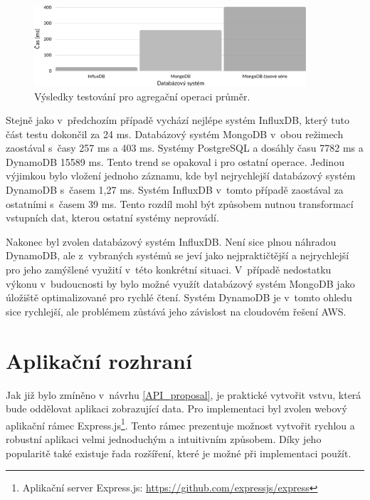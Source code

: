 \begin{figure}[H]
\label{averageAggregationTime}
\begin{center}
    \includegraphics[width=0.9\textwidth]{obrazky-figures/averageAggregationTime.pdf}
\end{center}
\caption{Výsledky testování pro agregační operaci průměr.}
\end{figure}

Stejně jako v~předchozím případě vychází nejlépe systém InfluxDB, který tuto část testu dokončil za 24 ms. Databázový systém MongoDB v~obou režimech zaostával s~časy 257 ms a 403 ms. Systémy PostgreSQL a  dosáhly času 7782 ms a DynamoDB 15589 ms. Tento trend se opakoval i pro ostatní operace. Jedinou výjimkou bylo vložení jednoho záznamu, kde byl nejrychlejší databázový systém DynamoDB s~časem 1,27 ms. Systém InfluxDB v~tomto případě zaostával za ostatními s~časem 39 ms. Tento rozdíl mohl být způsobem nutnou transformací vstupních dat, kterou ostatní systémy neprovádí.

Nakonec byl zvolen databázový systém InfluxDB. Není sice plnou náhradou DynamoDB, ale z~vybraných systémů se jeví jako nejpraktičtější a nejrychlejší pro jeho zamýšlené využití v~této konkrétní situaci. V~případě nedostatku výkonu v~budoucnosti by bylo možné využít databázový systém MongoDB jako úložiště optimalizované pro rychlé čtení. Systém DynamoDB je v~tomto ohledu sice rychlejší, ale problémem zůstává jeho závislost na cloudovém řešení AWS.

\section{Aplikační rozhraní}
Jak již bylo zmíněno v~návrhu \ref{API_proposal}, je praktické vytvořit vstvu, která bude oddělovat aplikaci zobrazující data. Pro implementaci byl zvolen webový aplikační rámec Express.js\footnote{Aplikační server Express.js: \url{https://github.com/expressjs/express}}. Tento rámec prezentuje možnost vytvořit rychlou a robustní aplikaci velmi jednoduchým a intuitivním způsobem. Díky jeho popularitě také existuje řada rozšíření, které je možné při implementaci použít. 

